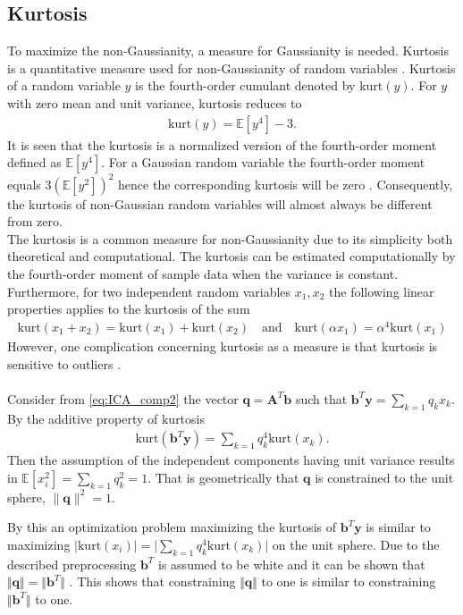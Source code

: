 \subsection{Kurtosis}
To maximize the non-Gaussianity, a measure for Gaussianity is needed. Kurtosis is a quantitative measure used for non-Gaussianity of random variables \cite[p. 171]{ICA}. 
Kurtosis of a random variable $y$ is the fourth-order cumulant denoted by $\text{kurt}(y)$. 
For $y$ with zero mean and unit variance, kurtosis reduces to 
\begin{align*}
\text{kurt} (y) = \mathbb{E}[y^4] - 3.
\end{align*} 
It is seen that the kurtosis is a normalized version of the fourth-order moment defined as $\mathbb{E}[y^4]$. 
For a Gaussian random variable the fourth-order moment equals $3(\mathbb{E}[y^2])^2$ hence the corresponding kurtosis will be zero \cite[p. 171]{ICA}. 
Consequently, the kurtosis of non-Gaussian random variables will almost always be different from zero.
\\
The kurtosis is a common measure for non-Gaussianity due to its simplicity both theoretical and computational. 
The kurtosis can be estimated computationally by the fourth-order moment of sample data when the variance is constant.
Furthermore, for two independent random variables $x_1, x_2$ the following linear properties applies to the kurtosis of the sum
\begin{align*}
\text{kurt}(x_1 + x_2) = \text{kurt}(x_1) + \text{kurt}(x_2) \quad \text{and} \quad \text{kurt}(\alpha x_1) = \alpha^4 \text{kurt}(x_1)
\end{align*}  
However, one complication concerning kurtosis as a measure is that kurtosis is sensitive to outliers \cite[p. 182]{ICA}.
\\ \\      
Consider from \eqref{eq:ICA_comp2} the vector $\mathbf{q} = \mathbf{A}^T \mathbf{b}$ such that $\mathbf{b}^T \mathbf{y} = \sum_{k=1} q_k x_k$. 
By the additive property of kurtosis
\begin{align*}
\text{kurt} \left( \mathbf{b}^T \mathbf{y} \right) = \sum_{k=1}q_k^4 \text{kurt}(x_k).
\end{align*}
Then the assumption of the independent components having unit variance results in $\mathbb{E}[x_i^2]= \sum_{k=1}q_k^2=1$. 
That is geometrically that $\mathbf{q}$ is constrained to the unit sphere, $\| \mathbf{q}\|^2 = 1$. 

By this an optimization problem maximizing the kurtosis of $\mathbf{b}^T \mathbf{y}$ is similar to maximizing $\vert \text{kurt}(x_i)\vert = \vert \sum_{k=1}q_k^4 \text{kurt}(x_k) \vert $ on the unit sphere.
Due to the described preprocessing $\mathbf{b}^T$ is assumed to be white and it can be shown that $\Vert \mathbf{q} \Vert = \Vert \mathbf{b}^T \Vert$ \cite[p. 174]{ICA}. 
This shows that constraining $\Vert \mathbf{q} \Vert$ to one is similar to constraining $\Vert \mathbf{b}^T \Vert$ to one. 

